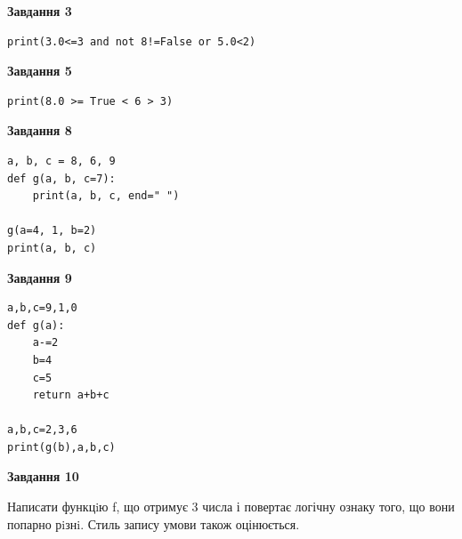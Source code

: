 \documentclass[12pt, ukrainian]{article}
\begin{document}
{\begin {large}
\begin{minipage}[t]{7.5cm}
\end{minipage}
\vline \hspace{6mm}
\begin{minipage}[t]{10.5cm}

\begin{center}
\textbf{Завдання 3}
\end{center}

\begin{verbatim}
print(3.0<=3 and not 8!=False or 5.0<2)
\end{verbatim}



\begin{center}
\textbf{Завдання 5}
\end{center}

\begin{verbatim}
print(8.0 >= True < 6 > 3)
\end{verbatim}



\begin{center}
\textbf{Завдання 8}
\end{center}

\begin{verbatim}
a, b, c = 8, 6, 9
def g(a, b, c=7):
    print(a, b, c, end=" ")

g(a=4, 1, b=2)
print(a, b, c)
\end{verbatim}



\begin{center}
\textbf{Завдання 9}
\end{center}

\begin{verbatim}
a,b,c=9,1,0
def g(a):
    a-=2
    b=4
    c=5
    return a+b+c

a,b,c=2,3,6
print(g(b),a,b,c)
\end{verbatim}



\begin{center}
\textbf{Завдання 10}
\end{center}

Написати функцiю f, що отримує 3 числа і повертає логічну ознаку того, що вони попарно рiзнi. Стиль запису умови також оцінюється.\par

\end{minipage}

\end {large}}
\newpage
\end{document}
